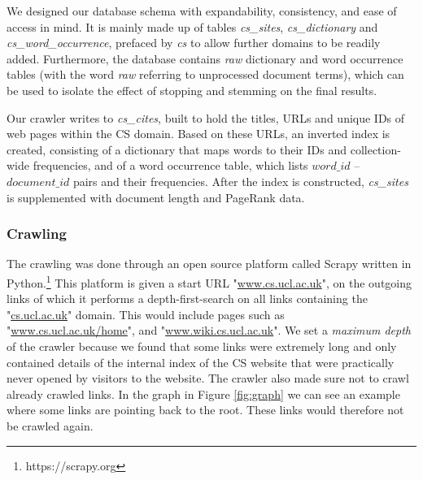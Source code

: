We designed our database schema with expandability, consistency, and ease of access in mind. It is mainly made up of tables \emph{cs\_sites}, \emph{cs\_dictionary} and \emph{cs\_word\_occurrence}, prefaced by \emph{cs} to allow further domains to be readily added. Furthermore, the database contains \emph{raw} dictionary and word occurrence tables (with the word \emph{raw} referring to unprocessed document terms), which can be used to isolate the effect of stopping and stemming on the final results.

Our crawler writes to \emph{cs\_cites}, built to hold the titles, URLs and unique IDs of web pages within the CS domain.
Based on these URLs, an inverted index is created, consisting of a dictionary that maps words to their IDs and collection-wide frequencies, and of a word occurrence table, which lists $word\_id$ -- $document\_id$ pairs and their frequencies. After the index is constructed, \emph{cs\_sites} is supplemented with document length and PageRank data.


\subsubsection{Crawling} %
\label{ssub:crawling}

The crawling was done through an open source platform called Scrapy written in Python.\footnote{https://scrapy.org} This platform is given a start URL "\url{www.cs.ucl.ac.uk}", on the outgoing links of which it performs a depth-first-search on all links containing the "\url{cs.ucl.ac.uk}" domain. This would include pages such as "\url{www.cs.ucl.ac.uk/home}", and "\url{www.wiki.cs.ucl.ac.uk}". We set a \emph{maximum depth} of the crawler because we found that some links were extremely long and only contained details of the internal index of the CS website that were practically never opened by visitors to the website. The crawler also made sure not to crawl already crawled links. In the graph in Figure \ref{fig:graph} we can see an example where some links are pointing back to the root. These links would therefore not be crawled again.

